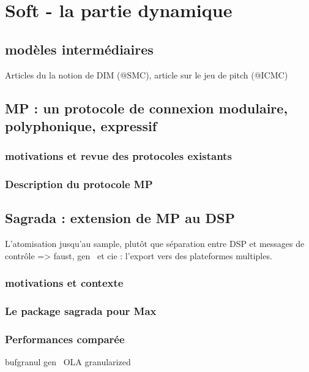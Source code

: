 %
\chapter{Soft - la partie dynamique}
\label{ch:mapping}


\section{modèles intermédiaires}
\label{sec:mapping:sec2}
Articles du la notion de DIM (@SMC), article sur le jeu de pitch (@ICMC)


\section{MP : un protocole de connexion modulaire, polyphonique, expressif}
\label{sec:mapping:sec1}

\subsection{motivations et revue des protocoles existants}

\subsection{Description du protocole MP}


\section{Sagrada : extension de MP au DSP}
\label{sec:mapping:sec1}

L’atomisation jusqu’au sample, plutôt que séparation entre DSP et messages de contrôle
=> faust, gen~ et cie : l’export vers des plateformes multiples.


\subsection{motivations et contexte}

\subsection{Le package sagrada pour Max}

\subsection{Performances comparée}
bufgranul
gen~ OLA
granularized